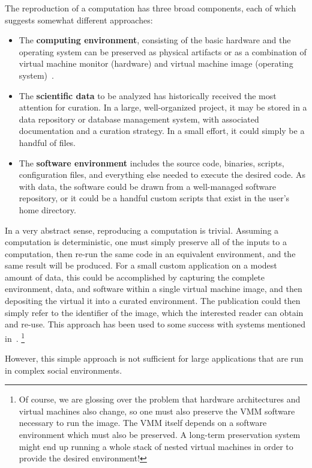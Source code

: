 \documentclass{sig-alternate}
\begin{document}
The reproduction of a computation has three broad components,
each of which suggests somewhat different approaches:

\begin{itemize}
\item The {\bf computing environment}, consisting of the basic hardware and the operating system can be preserved as physical artifacts or as a combination of virtual machine monitor (hardware) and virtual machine image (operating system)~\cite{matthews2009towards}.
\item The {\bf scientific data} to be analyzed has historically received the most attention for curation.  In a large, well-organized project, it may be stored in a  data repository or database management system, with associated documentation and a curation strategy.  In a small effort, it could simply be a handful of files.
\item The {\bf software environment} includes the source code, binaries, scripts, configuration files, and everything else needed to execute the desired code.  As with data, the software could be drawn from a well-managed software repository, or it could be a handful custom scripts that exist in the user's home directory.
\end{itemize}

In a very abstract sense, reproducing a computation is trivial.
Assuming a computation is deterministic, one must simply
preserve all of the inputs to a computation, then re-run
the same code in an equivalent environment, and the same result
will be produced.  For a small custom application on a modest
amount of data, this could be accomplished by capturing the
complete environment,
data, and software within a single virtual machine image,
and then depositing the virtual
it into a curated environment.  The publication could
then simply refer to the identifier of the image, which the
interested reader can obtain and re-use. This approach has
been used to some success with systems mentioned in~\cite{castagne2013consider}.
\footnote{Of course, we are glossing over the problem that hardware
architectures and virtual machines also change, so one must also
preserve the VMM software necessary to run the image.  The VMM itself
depends on a software environment which must also be preserved.
A long-term preservation system might end up running a whole
stack of nested virtual machines in order to provide the desired
environment! }

However, this simple approach is not sufficient for large applications
that are run in complex social environments.
\end{document}
